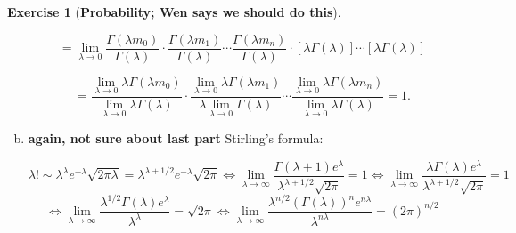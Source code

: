\documentclass{article}
\theoremstyle{definition}
\newtheorem{exercise}{Exercise}
\theoremstyle{definition}
\theoremstyle{definition}
\theoremstyle{definition}
\begin{document}
\begin{exercise}[\textbf{Probability; Wen says we should do this}]
\begin{enumerate}[(a)]
\[
= \lim_{\lambda \to 0}  \frac{ \Gamma(\lambda m_0) }{\Gamma(\lambda)}\cdot \frac{\Gamma(\lambda m_1)}{\Gamma(\lambda)} \cdots \frac{\Gamma(\lambda m_n)}{\Gamma(\lambda)}  \cdot  [\lambda  \Gamma(\lambda )] \cdots[ \lambda \Gamma(\lambda )]
\]


\[
 = \frac{  \lim_{\lambda \to 0} \lambda  \Gamma(\lambda m_0) } { \lim_{\lambda \to 0}   \lambda \Gamma(\lambda)}\cdot  \frac{  \lim_{\lambda \to 0} \lambda  \Gamma(\lambda m_1)}{ \lambda \lim_{\lambda \to 0}  \Gamma(\lambda)} \cdots  \frac{   \lim_{\lambda \to 0} \lambda \Gamma(\lambda m_n)}{ \lim_{\lambda \to 0} \lambda \Gamma(\lambda)}  = 1.
\]


%

%
%

\item \textbf{again, not sure about last part} Stirling's formula: 

\[
\lambda! \sim \lambda^\lambda e^{-\lambda} \sqrt{2\pi \lambda} = \lambda^{\lambda + 1/2} e^{-\lambda} \sqrt{2\pi } \iff \lim_{\lambda \to \infty} \frac{ \Gamma(\lambda+1) e^\lambda}{\lambda^{\lambda + 1/2}  \sqrt{2\pi }} = 1 \iff \lim_{\lambda \to \infty} \frac{\lambda \Gamma(\lambda) e^\lambda}{\lambda^{\lambda + 1/2}  \sqrt{2\pi }} = 1
\]
\[
 \iff \lim_{\lambda \to \infty} \frac{ \lambda^{1/2} \Gamma(\lambda) e^\lambda}{\lambda^{\lambda}  } = \sqrt{2\pi }  \iff \lim_{\lambda \to \infty} \frac{ \lambda^{n/2} \left( \Gamma(\lambda) \right)^n e^{n\lambda}}{\lambda^{n\lambda}  } = (2\pi )^{n/2}
\]


\end{enumerate}
\end{exercise}
\end{document}
